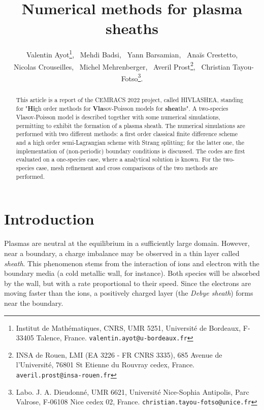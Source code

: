 \documentclass{article}
\title{Numerical methods for plasma sheaths}
\author{
	Valentin Ayot\footnote{Institut de Math\'ematiques, CNRS, UMR 5251, Universit\'e de Bordeaux, F-33405 Talence, France. \texttt{valentin.ayot@u-bordeaux.fr}}, 
	\ Mehdi Badsi,
	\ Yann Barsamian, 
	\ Ana\"is Crestetto,\\
	\ Nicolas Crouseilles,
	\ Michel Mehrenberger,
	 \ Averil Prost\footnote{INSA de Rouen, LMI (EA 3226 - FR CNRS 3335), 685 Avenue de l'Universit\'e, 76801 St Etienne du Rouvray cedex, France. \texttt{averil.prost@insa-rouen.fr}}, 
	 \ Christian Tayou-Fotso\footnote{Labo. J. A. Dieudonn\'e, UMR 6621, Universit\'e Nice-Sophia Antipolis, Parc Valrose, F-06108 Nice cedex 02, France. \texttt{christian.tayou-fotso@unice.fr}}.
 }
\date{}
\numberwithin{equation}{section}
\begin{document}
	
\maketitle

\begin{abstract}
	This article is a report of the   CEMRACS 2022 project, called HIVLASHEA, standing for "{\bf Hi}gh order methods for {\bf Vla}sov-Poisson models for {\bf shea}ths".
	A two-species Vlasov-Poisson model is described together with some numerical simulations, permitting to exhibit the formation of a plasma sheath. 
	The numerical simulations are performed with two different methods: a first order classical finite difference scheme and a high order semi-Lagrangian scheme with Strang splitting; for the latter one, the implementation
	of (non-periodic) boundary conditions is discussed. 
	The codes are first evaluated on a one-species case, where a analytical solution is known. For the two-species case, mesh refinement and cross comparisons of the two methods are performed.
\end{abstract}


\section{Introduction}
Plasmas are neutral at the equilibrium in a sufficiently large domain. However, near a boundary, a charge imbalance may be observed in a thin layer called \emph{sheath}.
This phenomenon stems from the interaction of ions and electron with the boundary media (a cold metallic wall, for instance). Both species will be absorbed by the wall, but with a rate proportional to their speed. Since the electrons are moving %
faster than the ions, a positively charged layer (the \emph{Debye sheath}) forms near the boundary. 
\end{document}
